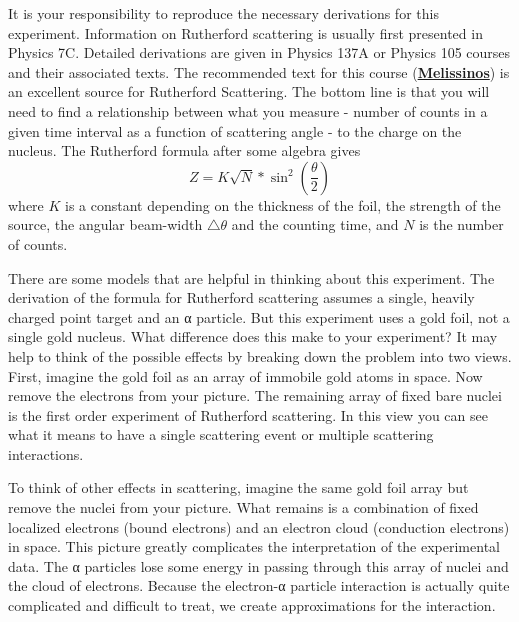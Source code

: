 \documentclass{../lab}
\begin{document}
It is your responsibility to reproduce the necessary derivations for this experiment. Information on Rutherford scattering is usually first presented in Physics 7C. Detailed derivations are given in Physics 137A or Physics 105 courses and their associated texts. The recommended text for this course (\href{http://physics111.lib.berkeley.edu/Physics111/Reprints/RUT/RUT\%20\%20melissinos\%201966\%20rutherford\%20scattering.pdf}{\textbf{Melissinos}}) is an excellent source for Rutherford Scattering. The bottom line is that you will need to find a relationship between what you measure - number of counts in a given time interval as a function of scattering angle - to the charge on the nucleus. The Rutherford formula after some algebra gives
\[Z = K \sqrt{N} * \sin^2 \left(\frac{\theta}{2}\right)\]
where $K$ is a constant depending on the thickness of the foil, 
the strength of the source, the angular beam-width $\triangle \theta$ and the counting time, 
and $N$ is the number of counts.

There are some models that are helpful in thinking about this experiment. The derivation of the formula for Rutherford scattering assumes a single, heavily charged point target and an α particle. But this experiment uses a gold foil, not a single gold nucleus. What difference does this make to your experiment? It may help to think of the possible effects by breaking down the problem into two views. First, imagine the gold foil as an array of immobile gold atoms in space. Now remove the electrons from your picture. The remaining array of fixed bare nuclei is the first order experiment of Rutherford scattering. In this view you can see what it means to have a single scattering event or multiple scattering interactions.

To think of other effects in scattering, imagine the same gold foil array but remove the nuclei from your picture. What remains is a combination of fixed localized electrons (bound electrons) and an electron cloud (conduction electrons) in space. This picture greatly complicates the interpretation of the experimental data. The α particles lose some energy in passing through this array of nuclei and the cloud of electrons. Because the electron-α particle interaction is actually quite complicated and difficult to treat, we create approximations for the interaction.
\end{document}
